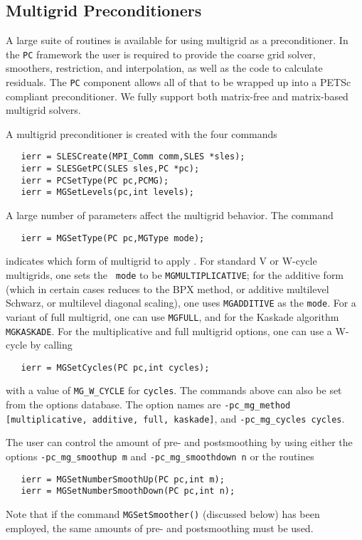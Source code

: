 \subsection{Multigrid Preconditioners} 

A large suite of routines is available for using multigrid as a
preconditioner. In the {\tt PC} framework the user is required to provide 
the coarse grid solver, smoothers, restriction, and interpolation, 
as well as the code to calculate residuals. The {\tt PC} component 
allows all of that to be wrapped up into a PETSc compliant preconditioner. 
We fully support both matrix-free and matrix-based multigrid solvers.

A multigrid preconditioner is created with the four commands 
\begin{verbatim}
   ierr = SLESCreate(MPI_Comm comm,SLES *sles);
   ierr = SLESGetPC(SLES sles,PC *pc);
   ierr = PCSetType(PC pc,PCMG);
   ierr = MGSetLevels(pc,int levels);
\end{verbatim}
A  
large number of parameters affect the multigrid behavior. The command
\begin{verbatim}
   ierr = MGSetType(PC pc,MGType mode); 
\end{verbatim}
indicates   which
   form of
multigrid to apply \cite{1sbg}. 
For standard V or W-cycle multigrids, one sets the {\tt
mode} to be  {\tt MGMULTIPLICATIVE}; for the
additive form (which in certain cases reduces to the BPX method, or additive 
multilevel Schwarz, or multilevel diagonal scaling), one uses
 {\tt MGADDITIVE} as the {\tt mode}.  For a variant
of full multigrid, one can
 use  {\tt MGFULL}, and for the Kaskade 
algorithm  {\tt MGKASKADE}.
For the multiplicative and full multigrid options, one can use a
W-cycle by   calling
 
\begin{verbatim}
   ierr = MGSetCycles(PC pc,int cycles);
\end{verbatim}
with a value of {\tt MG\_W\_CYCLE} for {\tt cycles}. 
The commands above can also be set from the options database. The option 
names are {\tt -pc\_mg\_method [multiplicative, additive, full, kaskade]},
and {\tt -pc\_mg\_cycles cycles}.  

The user can control the amount of pre- and postsmoothing 
  by using
either the options  
{\tt -pc\_mg\_smoothup~m} and {\tt -pc\_mg\_smoothdown~n} or
the routines  
\begin{verbatim}
   ierr = MGSetNumberSmoothUp(PC pc,int m);
   ierr = MGSetNumberSmoothDown(PC pc,int n);
\end{verbatim}
Note that if the command {\tt MGSetSmoother()} (discussed below) has
 been employed, the same amounts of pre-
and postsmoothing must be used.

